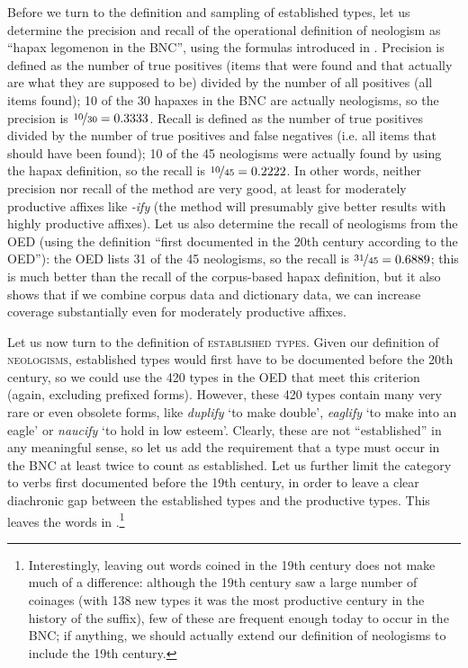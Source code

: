 Before we turn to the definition and sampling of established types,  let us determine the precision  and recall  of the operational  definition of neologism  as ``hapax  legomenon in the BNC'',  using the formulas introduced in . Precision is defined as the number of true positives (items that were found and that actually are what they are supposed to be) divided by the number of all positives (all items found); 10 of the 30 hapaxes in the BNC  are actually neologisms, so the precision is $\nicefrac{10}{30} = 0.3333$. Recall is defined as the number of true positives divided by the number of true positives and false negatives (i.e. all items that should have been found); 10 of the 45 neologisms  were actually found by using the hapax definition, so the recall is $\nicefrac{10}{45} = 0.2222$. In other words, neither precision  nor recall of the method are very good, at least for moderately productive  affixes  like \textit{-ify} (the method will presumably give better results with highly productive affixes).  Let us also determine the recall of neologisms from the OED  (using the definition ``first documented in the 20th century according to the OED''): the OED  lists 31 of the 45 neologisms,  so the recall is $\nicefrac{31}{45} = 0.6889$; this is much better than the recall  of the corpus\hyp{}based hapax  definition, but it also shows that if we combine corpus data and dictionary  data, we can increase coverage substantially even for moderately productive   affixes.

Let us now turn to the definition of \textsc{established types}.  Given our definition of \textsc{neologisms},  established types would first have to be documented before the 20th century, so we could use the 420 types in the OED  that meet this criterion (again, excluding prefixed  forms). However, these 420 types contain many very rare or even obsolete forms, like \textit{duplify} `to make double', \textit{eaglify} `to make into an eagle' or \textit{naucify} `to hold in low esteem'. Clearly, these are not ``established'' in any meaningful sense, so let us add the requirement that a type must occur in the BNC  at least twice to count as established. Let us further limit the category to verbs  first documented before the 19th century, in order to leave a clear diachronic  gap between the established types  and the productive  types. This leaves the words in .\footnote{Interestingly, leaving out words coined in the 19th century does not make much of a difference: although the 19th century saw a large number of coinages (with 138 new types  it was the most productive  century in the history of the suffix),  few of these are frequent enough today to occur in the BNC;  if anything, we should actually extend our definition of neologisms  to include the 19th century.}


